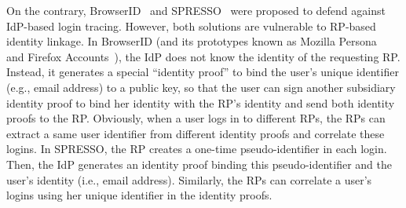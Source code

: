 On the contrary, BrowserID~\cite{BrowserID} and SPRESSO~\cite{SPRESSO} were proposed to defend against IdP-based login tracing. However, both solutions are vulnerable to RP-based identity linkage. In BrowserID (and its prototypes known as Mozilla Persona~\cite{persona} and Firefox Accounts~\cite{FirefoxAccount}), the IdP does not know the identity of the requesting RP. Instead, it generates a special ``identity proof'' to bind the user's unique identifier (e.g., email address) to a public key, so that the user can sign another subsidiary identity proof to bind her identity with the RP's identity and send both identity proofs to the RP. Obviously, when a user logs in to different RPs, the RPs can extract a same user identifier from different identity proofs and correlate these logins. In SPRESSO, the RP creates a one-time pseudo-identifier in each login. Then, the IdP generates an identity proof binding this pseudo-identifier and the user's identity (i.e., email address). %
Similarly, the RPs can correlate a user's logins using her unique identifier in the identity proofs.

